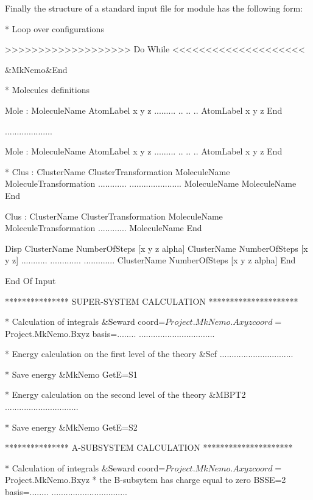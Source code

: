 Finally the structure of a standard input file for  module has the following form:
\begin{sourcelisting}

* Loop over configurations

>>>>>>>>>>>>>>>>>>> Do While <<<<<<<<<<<<<<<<<<<<

  &MkNemo&End

    * Molecules definitions

    Mole : MoleculeName
      AtomLabel  x  y  z
      .........  .. .. ..
      AtomLabel  x  y  z
    End

    ....................

    Mole : MoleculeName
      AtomLabel  x  y  z
      .........  .. .. ..
      AtomLabel  x  y  z
    End

    *
    Clus : ClusterName  ClusterTransformation
      MoleculeName  MoleculeTransformation
      ............  ......................
      MoleculeName
      MoleculeName
    End

    Clus : ClusterName  ClusterTransformation
      MoleculeName  MoleculeTransformation
      ............
      MoleculeName
    End


    Disp
      ClusterName  NumberOfSteps [x y z alpha]
      ClusterName  NumberOfSteps [x y z]
      ...........  ............. .............
      ClusterName  NumberOfSteps [x y z alpha]
    End


  End Of Input

  *************** SUPER-SYSTEM CALCULATION *********************

  * Calculation of integrals
  &Seward
    coord=$Project.MkNemo.Axyz
    coord=$Project.MkNemo.Bxyz
    basis=........
     ................................

  * Energy calculation on the first level of the theory
  &Scf
     ...............................

  * Save energy
  &MkNemo
    GetE=S1

  * Energy calculation on the second level of the theory
  &MBPT2
     ...............................

  * Save energy
  &MkNemo
    GetE=S2


  *************** A-SUBSYSTEM CALCULATION *********************

  * Calculation of integrals
  &Seward
    coord=$Project.MkNemo.Axyz
    coord=$Project.MkNemo.Bxyz
    * the B-subsytem has charge equal to zero
    BSSE=2
    basis=........
     ................................


\end{sourcelisting}
